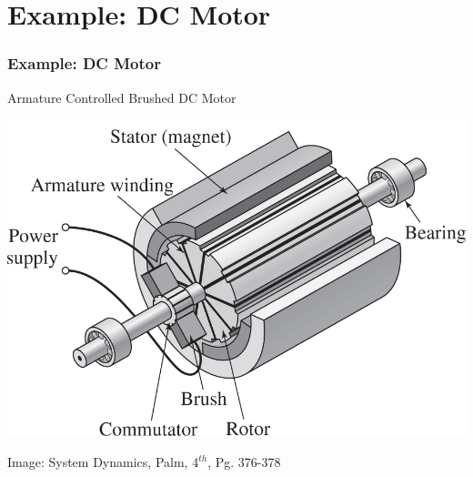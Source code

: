 \documentclass{beamer}                  %
\newcommand{\sectiontitleII}{Example: DC Motor}
\begin{document}
\section{\sectiontitleII}
	
	\begin{frame}[label=sectionII,containsverbatim] \small
        \frametitle{\sectiontitleII}
		Armature Controlled Brushed DC Motor \vspc

		\includegraphics[scale=.85]{paL40056_06_05_03_cropped.png}

		\btVFill
		\tiny{Image: System Dynamics, Palm, 4$^{th}$, Pg. 376-378}
		
	\end{frame}
\end{document}

